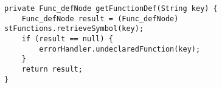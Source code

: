 \begin{lstlisting}[caption={Private function in the symbol table visitor for verifying a function declaration.}, label={code:STV:FuncDclCheck}]
private Func_defNode getFunctionDef(String key) {
    Func_defNode result = (Func_defNode) stFunctions.retrieveSymbol(key);
    if (result == null) {
        errorHandler.undeclaredFunction(key);
    }
    return result;
}
\end{lstlisting}

